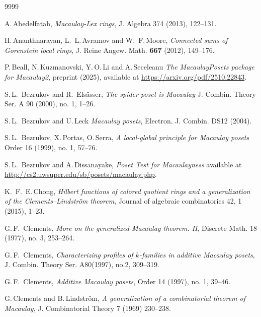 \documentclass[11pt, reqno]{amsart}
\theoremstyle{plain} %
\theoremstyle{definition}
\theoremstyle{remark}
\numberwithin{equation}{section}  %
\begin{document}
\begin{thebibliography}{9999}

A.\,Abedelfatah, {\em Macaulay-Lex rings},
J. Algebra   374 (2013), 122--131.

H.\,Ananthnarayan, L.~L.\,Avramov and W.~F.\,Moore, {\em Connected sums of Gorenstein local rings}, J. Reine Angew. Math. {\bf 667} (2012), 149--176.

P.\,Beall, N.\,Kuzmanovski, Y.\,O.\,Li and A.\,Seceleanu {\em The MacaulayPosets package for Macaulay2}, preprint (2025), available at \url{https://arxiv.org/pdf/2510.22843}.

 S.\,L.\, Bezrukov and R.\, Els\"{a}sser, {\em The spider poset is Macaulay}
J. Combin. Theory Ser. A 90 (2000), no. 1, 1--26.%

 S.\,L.\, Bezrukov and U.\,Leck {\em Macaulay posets}, Electron. J. Combin. DS12 (2004). %

 S.\,L.\, Bezrukov, X.\,Portas, O.\,Serra, {\em A local-global principle for Macaulay posets} Order 16 (1999), no. 1, 57--76.%

 S.\,L.\, Bezrukov and A.\,Dissanayake, {\em Poset Test for Macaulayness} available at \url{http://cs2.uwsuper.edu/sb/posets/macaulay.php}.

 K.\, F.\, E.\,Chong, 
{\em Hilbert functions of colored quotient rings and a generalization of the Clements--Lindstr\"om theorem},
 Journal of algebraic combinatorics 42, 1 (2015), 1--23.

  G.\,F.\, Clements, {\em More on the generalized Macaulay theorem. II},
Discrete Math. 18 (1977), no. 3, 253--264.

 G.\,F.\, Clements, 
{\em Characterizing profiles of $k$-families in additive Macaulay posets}, J. Combin. Theory Ser. A80(1997), no.2, 309--319.

 G.\,F.\, Clements, 
{\em Additive Macaulay posets},
Order 14 (1997), no. 1, 39--46.

G.\,Clements and B.\,Lindstr\"om, {\em A generalization of a combinatorial theorem of Macaulay}, J. Combinatorial Theory 7 (1969) 230--238. 



\end{thebibliography}
\end{document}
